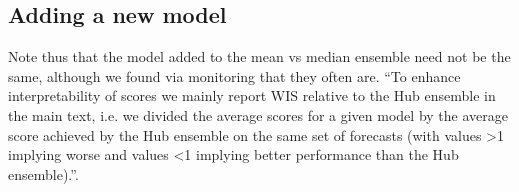 \subsection{Adding a new model}
Note thus that the model added to the mean vs median ensemble need not be the same, although we found via monitoring that they often are.
``To enhance
interpretability of scores we mainly report WIS relative to the Hub ensemble in the main text, i.e. we divided
the average scores for a given model by the average score achieved by the Hub ensemble on the same set of
forecasts (with values >1 implying worse and values <1 implying better performance than the Hub ensemble).''\cite{bosse_comparing_2021}.
